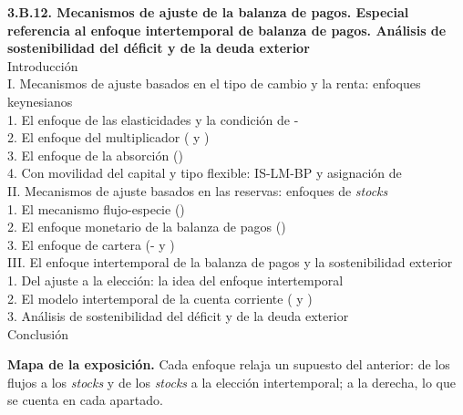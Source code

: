 \documentclass[11pt]{article}
\begin{document}
\begin{esquema}
\textbf{3.B.12. Mecanismos de ajuste de la balanza de pagos. Especial referencia al enfoque intertemporal de balanza de pagos. Análisis de sostenibilidad del déficit y de la deuda exterior}\\[2pt]
Introducción\\
I. Mecanismos de ajuste basados en el tipo de cambio y la renta: enfoques keynesianos\\
\hspace*{1.5em}1. El enfoque de las elasticidades y la condición de -\\
\hspace*{1.5em}2. El enfoque del multiplicador ( y )\\
\hspace*{1.5em}3. El enfoque de la absorción ()\\
\hspace*{1.5em}4. Con movilidad del capital y tipo flexible: IS-LM-BP y asignación de \\
II. Mecanismos de ajuste basados en las reservas: enfoques de \emph{stocks}\\
\hspace*{1.5em}1. El mecanismo flujo-especie ()\\
\hspace*{1.5em}2. El enfoque monetario de la balanza de pagos ()\\
\hspace*{1.5em}3. El enfoque de cartera (- y )\\
III. El enfoque intertemporal de la balanza de pagos y la sostenibilidad exterior\\
\hspace*{1.5em}1. Del ajuste a la elección: la idea del enfoque intertemporal\\
\hspace*{1.5em}2. El modelo intertemporal de la cuenta corriente ( y )\\
\hspace*{1.5em}3. Análisis de sostenibilidad del déficit y de la deuda exterior\\
Conclusión
\end{esquema}

\begin{anotaciones}
\textbf{Mapa de la exposición.} Cada enfoque relaja un supuesto del anterior: de los flujos a los \emph{stocks} y de los \emph{stocks} a la elección intertemporal; a la derecha, lo que se cuenta en cada apartado.
\begin{infografiacaja}
\caption{Mapa del tema: la pregunta de cada bloque, sus apartados y el hilo que los une}\label{figu:mapa-tema}
\end{infografiacaja}
\end{anotaciones}
\end{document}
